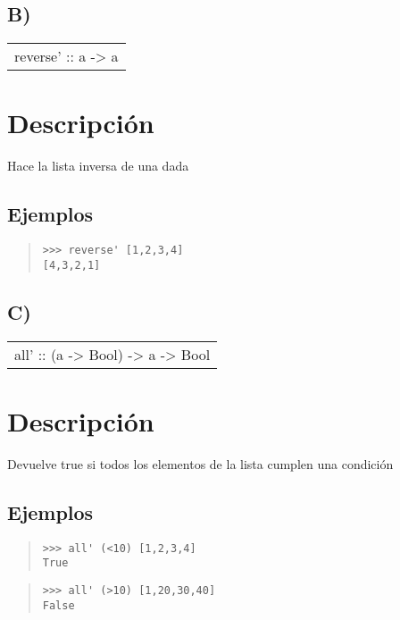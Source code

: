 \subsection{B)}
\begin{haddockdesc}
\item[\begin{tabular}{@{}l}
reverse' :: {\char 91}a{\char 93} -> {\char 91}a{\char 93}
\end{tabular}]
{\haddockbegindoc
\section*{Descripción}
Hace la lista inversa de una dada\par
\subsection*{Ejemplos}
\begin{quote}
{\haddockverb\begin{verbatim}
>>> reverse' [1,2,3,4]
[4,3,2,1]

\end{verbatim}}
\end{quote}}
\end{haddockdesc}
\subsection{C)}
\begin{haddockdesc}
\item[\begin{tabular}{@{}l}
all' :: (a -> Bool) -> {\char 91}a{\char 93} -> Bool
\end{tabular}]
{\haddockbegindoc
\section*{Descripción}
Devuelve true si todos los elementos de la lista cumplen una condición\par
\subsection*{Ejemplos}
\begin{quote}
{\haddockverb\begin{verbatim}
>>> all' (<10) [1,2,3,4]
True

\end{verbatim}}
\end{quote}
\begin{quote}
{\haddockverb\begin{verbatim}
>>> all' (>10) [1,20,30,40]
False

\end{verbatim}}
\end{quote}}
\end{haddockdesc}
